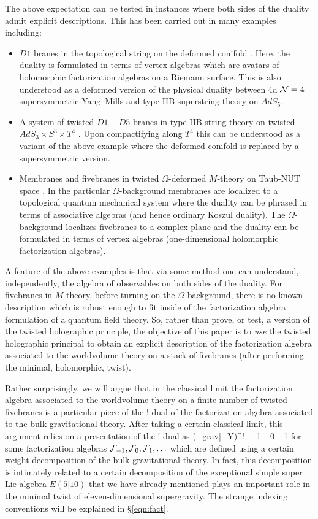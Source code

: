 \documentclass[11pt]{amsart}
\begin{document}
The above expectation can be tested in instances where both sides of the duality admit explicit descriptions. 
This has been carried out in many examples including:
\begin{itemize}
\item $D1$ branes in the topological string on the deformed conifold \cite{costello2021twisted}.
Here, the duality is formulated in terms of vertex algebras which are avatars of holomorphic factorization algebras on a Riemann surface.
This is also understood as a deformed version of the physical duality between 4d $\mathcal N=4$ supersymmetric Yang--Mills and type IIB superstring theory on $AdS_5$. 
\item A system of twisted $D1-D5$ branes in type IIB string theory on twisted $AdS_3 \times S^3 \times T^4$ \cite{CP1}. 
Upon compactifying along $T^4$ this can be understood as a variant of the above example where the deformed conifold is replaced by a supersymmetric version.
\item Membranes and fivebranes in twisted $\Omega$-deformed $M$-theory on Taub-NUT space \cite{CostelloM5,CostelloM2}.
In the particular $\Omega$-background membranes are localized to a topological quantum mechanical system where the duality can be phrased in terms of associative algebras (and hence ordinary Koszul duality). 
The $\Omega$-background localizes fivebranes to a complex plane and the duality can be formulated in terms of vertex algebras (one-dimensional holomorphic factorization algebras). 
\end{itemize}

A feature of the above examples is that via some method one can understand, independently, the algebra of observables on both sides of the duality. 
For fivebranes in $M$-theory, before turning on the $\Omega$-background, there is no known description which is robust enough to fit inside of the factorization algebra formulation of a quantum field theory.
So, rather than prove, or test, a version of the twisted holographic principle, the objective of this paper is to \textit{use} the twisted holographic principal to obtain an explicit description of the factorization algebra associated to the worldvolume theory on a stack of fivebranes (after performing the minimal, holomorphic, twist). 

Rather surprisingly, we will argue that in the classical limit the factorization algebra associated to the worldvolume theory on a finite number of twisted fivebranes is a particular piece of the $!$-dual of the factorization algebra associated to the bulk gravitational theory. 
After taking a certain classical limit, this argument relies on a presentation of the $!$-dual as
\beqn
(\Obs_{grav}|_{Y})^{!} \simeq \cF_{-1} \otimes \cF_0 \otimes \cF_1 \otimes \cdots 
\eeqn
for some factorization algebras $\mathcal F_{-1},\mathcal F_0, \mathcal F_{1},\ldots$ which are defined using a certain weight decomposition of the bulk gravitational theory.
In fact, this decomposition is intimately related to a certain decomposition of the exceptional simple super Lie algebra $E(5|10)$ that we have already mentioned plays an important role in the minimal twist of eleven-dimensional supergravity.
The strange indexing conventions will be explained in \S\ref{eqn:fact}. 
\end{document}
